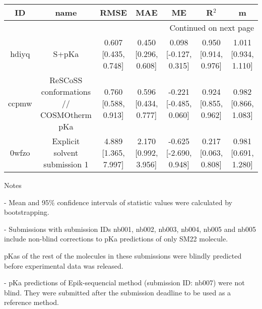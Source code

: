 \documentclass{article}
\begin{document}
\begin{center}
\begin{longtable}{|ccccccc|}
\toprule
    ID &                                     name &                  RMSE &                   MAE &                      ME &                 R$^2$ &                     m \\
\midrule
\endhead
\midrule
\multicolumn{7}{r}{{Continued on next page}} \\
\midrule
\endfoot

\bottomrule
\endlastfoot
 hdiyq &                                    S+pKa &  0.607 [0.435, 0.748] &  0.450 [0.296, 0.608] &   0.098 [-0.127, 0.315] &  0.950 [0.914, 0.976] &  1.011 [0.934, 1.110] \\
 ccpmw &  ReSCoSS conformations // COSMOtherm pKa &  0.760 [0.588, 0.913] &  0.596 [0.434, 0.777] &  -0.221 [-0.485, 0.060] &  0.924 [0.855, 0.962] &  0.982 [0.866, 1.083] \\
 0wfzo &            Explicit solvent submission 1 &  4.889 [1.365, 7.997] &  2.170 [0.992, 3.956] &  -0.625 [-2.690, 0.948] &  0.217 [0.063, 0.808] &  0.981 [0.691, 1.280] \\
\end{longtable}
\end{center}

Notes

- Mean and 95\% confidence intervals of statistic values were calculated by bootstrapping.

- Submissions with submission IDs nb001, nb002, nb003, nb004, nb005 and nb005 include non-blind corrections to pKa predictions of only SM22 molecule.

pKas of the rest of the molecules in these submissions were blindly predicted before experimental data was released.

- pKa predictions of Epik-sequencial method (submission ID: nb007) were not blind. They were submitted after the submission deadline to be used as a reference method.
\end{document}
